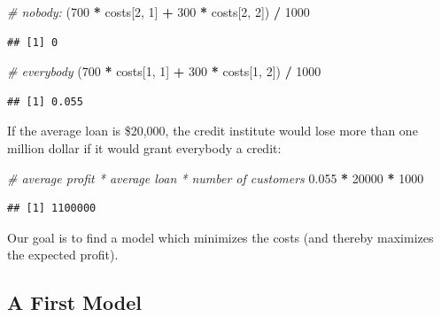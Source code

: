 \documentclass[]{scrbook}
\newenvironment{Shaded}{\begin{snugshade}}{\end{snugshade}}
\newcommand{\CommentTok}[1]{\textcolor[rgb]{0.56,0.35,0.01}{\textit{#1}}}
\newcommand{\DecValTok}[1]{\textcolor[rgb]{0.00,0.00,0.81}{#1}}
\newcommand{\FloatTok}[1]{\textcolor[rgb]{0.00,0.00,0.81}{#1}}
\newcommand{\NormalTok}[1]{#1}
\newcommand{\OperatorTok}[1]{\textcolor[rgb]{0.81,0.36,0.00}{\textbf{#1}}}
\newcommand{\StringTok}[1]{\textcolor[rgb]{0.31,0.60,0.02}{#1}}
\renewenvironment{Shaded} {\begin{snugshade}\small} {\end{snugshade}}
\begin{document}
\begin{Shaded}
\begin{Highlighting}[]
\CommentTok{# nobody:}
\NormalTok{(}\DecValTok{700} \OperatorTok{*}\StringTok{ }\NormalTok{costs[}\DecValTok{2}\NormalTok{, }\DecValTok{1}\NormalTok{] }\OperatorTok{+}\StringTok{ }\DecValTok{300} \OperatorTok{*}\StringTok{ }\NormalTok{costs[}\DecValTok{2}\NormalTok{, }\DecValTok{2}\NormalTok{]) }\OperatorTok{/}\StringTok{ }\DecValTok{1000}
\end{Highlighting}
\end{Shaded}

\begin{verbatim}
## [1] 0
\end{verbatim}

\begin{Shaded}
\begin{Highlighting}[]
\CommentTok{# everybody}
\NormalTok{(}\DecValTok{700} \OperatorTok{*}\StringTok{ }\NormalTok{costs[}\DecValTok{1}\NormalTok{, }\DecValTok{1}\NormalTok{] }\OperatorTok{+}\StringTok{ }\DecValTok{300} \OperatorTok{*}\StringTok{ }\NormalTok{costs[}\DecValTok{1}\NormalTok{, }\DecValTok{2}\NormalTok{]) }\OperatorTok{/}\StringTok{ }\DecValTok{1000}
\end{Highlighting}
\end{Shaded}

\begin{verbatim}
## [1] 0.055
\end{verbatim}

If the average loan is \$20,000, the credit institute would lose more than one million dollar if it would grant everybody a credit:

\begin{Shaded}
\begin{Highlighting}[]
\CommentTok{# average profit * average loan * number of customers}
\FloatTok{0.055} \OperatorTok{*}\StringTok{ }\DecValTok{20000} \OperatorTok{*}\StringTok{ }\DecValTok{1000}
\end{Highlighting}
\end{Shaded}

\begin{verbatim}
## [1] 1100000
\end{verbatim}

Our goal is to find a model which minimizes the costs (and thereby maximizes the expected profit).

\hypertarget{a-first-model}{%
\subsection{A First Model}\label{a-first-model}}
\end{document}
